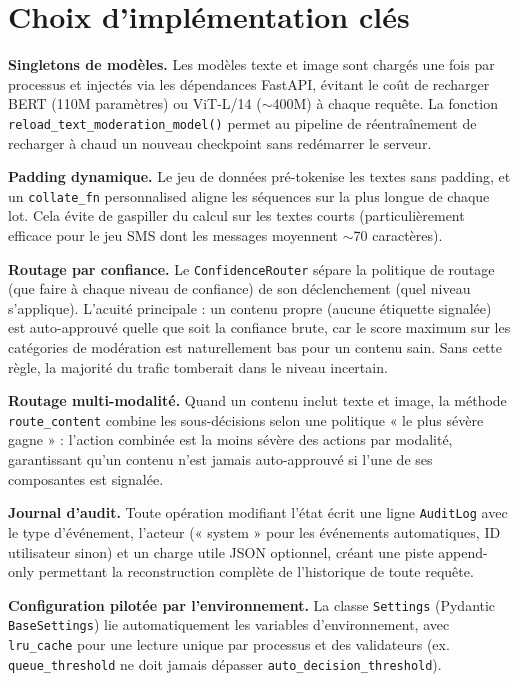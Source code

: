 \section{Choix d'implémentation clés}

\textbf{Singletons de modèles.} Les modèles texte et image sont chargés une fois par processus et injectés via les dépendances FastAPI, évitant le coût de recharger BERT (110M paramètres) ou ViT-L/14 ($\sim$400M) à chaque requête. La fonction \texttt{reload\_text\_moderation\_model()} permet au pipeline de réentraînement de recharger à chaud un nouveau checkpoint sans redémarrer le serveur.

\textbf{Padding dynamique.} Le jeu de données pré-tokenise les textes sans padding, et un \texttt{collate\_fn} personnalised aligne les séquences sur la plus longue de chaque lot. Cela évite de gaspiller du calcul sur les textes courts (particulièrement efficace pour le jeu SMS dont les messages moyennent $\sim$70 caractères).

\textbf{Routage par confiance.} Le \texttt{ConfidenceRouter} sépare la politique de routage (que faire à chaque niveau de confiance) de son déclenchement (quel niveau s'applique). L'acuité principale : un contenu propre (aucune étiquette signalée) est auto-approuvé quelle que soit la confiance brute, car le score maximum sur les catégories de modération est naturellement bas pour un contenu sain. Sans cette règle, la majorité du trafic tomberait dans le niveau incertain.

\textbf{Routage multi-modalité.} Quand un contenu inclut texte et image, la méthode \texttt{route\_content} combine les sous-décisions selon une politique « le plus sévère gagne » : l'action combinée est la moins sévère des actions par modalité, garantissant qu'un contenu n'est jamais auto-approuvé si l'une de ses composantes est signalée.

\textbf{Journal d'audit.} Toute opération modifiant l'état écrit une ligne \texttt{AuditLog} avec le type d'événement, l'acteur (« system » pour les événements automatiques, ID utilisateur sinon) et un charge utile JSON optionnel, créant une piste append-only permettant la reconstruction complète de l'historique de toute requête.

\textbf{Configuration pilotée par l'environnement.} La classe \texttt{Settings} (Pydantic \texttt{BaseSettings}) lie automatiquement les variables d'environnement, avec \texttt{lru\_cache} pour une lecture unique par processus et des validateurs (ex. \texttt{queue\_threshold} ne doit jamais dépasser \texttt{auto\_decision\_threshold}).


